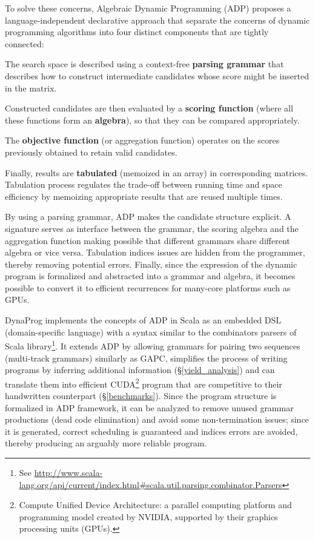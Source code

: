 To solve these concerns, Algebraic Dynamic Programming (ADP) \cite{adp} proposes a language-independent declarative approach that separate the concerns of dynamic programming algorithms into four distinct components that are tightly connected:\ol
\item The search space is described using a context-free \textbf{parsing grammar} that describes how to construct intermediate candidates whose score might be inserted in the matrix.
\item Constructed candidates are then evaluated by a \textbf{scoring function} (where all these functions form an \textbf{algebra}), so that they can be compared appropriately.
\item The \textbf{objective function} (or aggregation function) operates on the scores previously obtained to retain valid candidates.
\item Finally, results are \textbf{tabulated} (memoized in an array) in corresponding matrices. Tabulation process regulates the trade-off between running time and space efficiency by memoizing appropriate results that are reused multiple times.
\ole

By using a parsing grammar, ADP makes the candidate structure explicit. A signature serves as interface between the grammar, the scoring algebra and the aggregation function making possible that different grammars share different algebra or vice versa. Tabulation indices issues are hidden from the programmer, thereby removing potential errors. Finally, since the expression of the dynamic program is formalized and abstracted into a grammar and algebra, it becomes possible to convert it to efficient recurrences for many-core platforms such as GPUs. \cite{adp_gpu}

DynaProg implements the concepts of ADP in Scala as an embedded DSL (domain-specific language) with a syntax similar to the combinators parsers of Scala library\footnote{See \url{http://www.scala-lang.org/api/current/index.html\#scala.util.parsing.combinator.Parsers}}. It extends ADP by allowing grammars for pairing two sequences (multi-track grammars) similarly as GAPC\cite{gapc_thesis}, simplifies the process of writing programs by inferring additional information (\S\ref{yield_analysis}) and can translate them into efficient CUDA\footnote{Compute Unified Device Architecture: a parallel computing platform and programming model created by NVIDIA, supported by their graphics processing units (GPUs).} program that are competitive to their handwritten counterpart (\S\ref{benchmarks}). Since the program structure is formalized in ADP framework, it can be analyzed to remove unused grammar productions (dead code elimination) and avoid some non-termination issues; since it is generated, correct scheduling is guaranteed and indices errors are avoided, thereby producing an arguably more reliable program.

